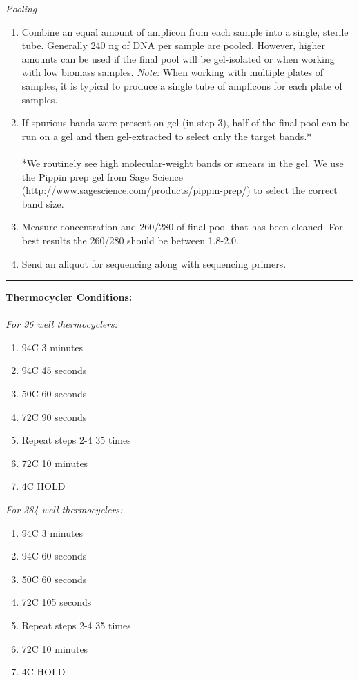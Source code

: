 \documentclass[11pt]{article}
\begin{document}
\emph{Pooling}
\begin{enumerate}[resume]
\item Combine an equal amount of amplicon from each sample into a single, sterile tube. Generally 240 ng of DNA per sample are pooled. However, higher amounts can be used if the final pool will be gel-isolated or when working with low biomass samples.
\emph{Note:} When working with multiple plates of samples, it is typical to produce a single tube of amplicons for each plate of samples.
\item If spurious bands were present on gel (in step 3), half of the final pool can be run on a gel and then gel-extracted to select only the target bands.*
\\
\\
*We routinely see high molecular-weight bands or smears in the gel. We use the Pippin prep gel from Sage Science (\href{http://www.sagescience.com/products/pippin-prep/}{http://www.sagescience.com/products/pippin-prep/}) to select the correct band size.
\item Measure concentration and 260/280 of final pool that has been cleaned. For best results the 260/280 should be between 1.8-2.0.
\item Send an aliquot for sequencing along with sequencing primers.
\end{enumerate}
\rule{\textwidth}{1pt} %
\textbf{Thermocycler Conditions:}
\\
\\
\emph{For 96 well thermocyclers:}
\begin{enumerate}
\item 94\degree C 3 minutes
\item 94\degree C 45 seconds
\item 50\degree C 60 seconds
\item 72\degree C 90 seconds
\item Repeat steps 2-4 35 times
\item 72\degree C 10 minutes
\item 4\degree C HOLD
\end{enumerate}
\emph{For 384 well thermocyclers:}
\begin{enumerate}
\item 94\degree C 3 minutes
\item 94\degree C 60 seconds
\item 50\degree C 60 seconds
\item 72\degree C 105 seconds
\item Repeat steps 2-4 35 times
\item 72\degree C 10 minutes
\item 4\degree C HOLD
\end{enumerate}
\end{document}
